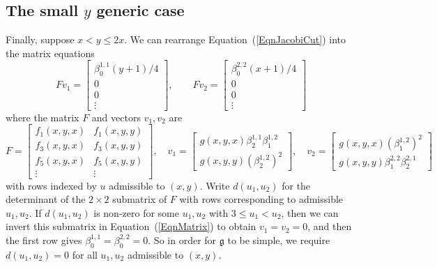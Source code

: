\documentclass[11pt,a4paper,reqno]{amsart}
\theoremstyle{definition}
\numberwithin{equation}{section}
\newcommand{\fg}{\mathfrak{g}}
\begin{document}
\subsection{The small $y$ generic case}\label{SecGeneric3} Finally, suppose $x<y\leq 2x$. We can rearrange Equation~(\ref{EqnJacobiCut}) into the matrix equations
\begin{equation}\label{EqnMatrix}
Fv_1=\begin{bmatrix}\beta^{1,1}_0(y+1)/4\\0\\0\\\vdots\end{bmatrix},\qquad
Fv_2=\begin{bmatrix}\beta^{2,2}_0(x+1)/4\\0\\0\\\vdots\end{bmatrix}
\end{equation}
where the matrix $F$ and vectors $v_1,v_2$ are
\[F=\begin{bmatrix}f_1(x,y,x) & f_1(x,y,y)\\f_3(x,y,x) & f_3(x,y,y)\\f_5(x,y,x) & f_5(x,y,y)\\\vdots & \vdots\end{bmatrix},\quad
v_1=\begin{bmatrix}g(x,y,x)\beta^{1,1}_2\beta^{1,2}_1\\g(x,y,y)(\beta^{1,2}_2)^2\end{bmatrix},\quad 
v_2=\begin{bmatrix}g(x,y,x)(\beta^{1,2}_1)^2\\g(x,y,y)\beta^{2,2}_1\beta^{2,1}_2\end{bmatrix}\]
with rows indexed by $u$ admissible to $(x,y)$. Write $d(u_1,u_2)$ for the determinant of the $2\times2$ submatrix of $F$ with rows corresponding to admissible $u_1,u_2$. If $d(u_1,u_2)$ is non-zero for some $u_1,u_2$ with $3\leq u_1<u_2$, then we can invert this submatrix in Equation~(\ref{EqnMatrix}) to obtain $v_1=v_2=0$, and then the first row gives $\beta^{1,1}_0=\beta^{2,2}_0=0$. So in order for $\fg$ to be simple, we require $d(u_1,u_2)=0$ for all $u_1,u_2$ admissible to $(x,y)$.
\end{document}
